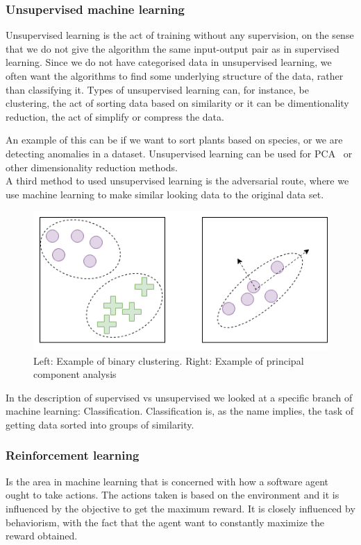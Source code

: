 \subsubsection{Unsupervised machine learning}
Unsupervised learning is the act of training without any supervision, on the sense that we do not give the algorithm the same input-output pair as in supervised learning. 
Since we do not have categorised data in unsupervised learning, we often want the algorithms to find some underlying structure of the data, rather than classifying it.
Types of unsupervised learning can, for instance, be clustering, the act of sorting data based on similarity or it can be dimentionality reduction, the act of simplify or compress the data.

An example of this can be if we want to sort plants based on species, or we are detecting anomalies in a dataset. Unsupervised learning can be used for PCA~ %
or other dimensionality reduction methods.\\
A third method to used unsupervised learning is the adversarial route, where we use machine learning to make similar looking data to the original data set. 
        
\begin{figure}
    \centering
    \includegraphics[scale=0.5]{figures/cluster_pca.png}
    \caption{Left: Example of binary clustering. Right: Example of principal component analysis} 
\end{figure}

In the description of supervised vs unsupervised we looked at a specific branch of machine learning: Classification. Classification is, as the name implies, the task of getting data sorted into groups of similarity. 
      

      
\subsubsection{Reinforcement learning}
Is the area in machine learning that is concerned with how a software agent ought to take actions.
The actions taken is based on the environment and it is influenced by the objective to get the maximum reward.
It is closely influenced by behaviorism, with the fact that the agent want to constantly maximize the reward obtained. 


